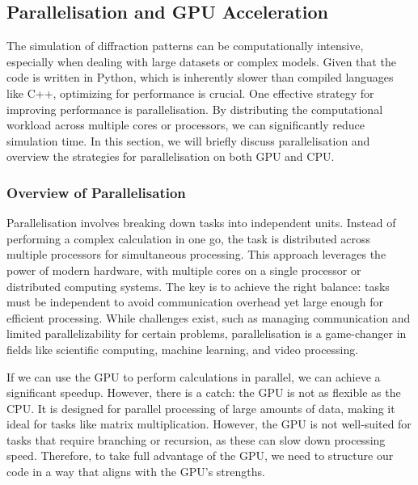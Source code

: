 \subsection{Parallelisation and GPU Acceleration}

The simulation of diffraction patterns can be computationally intensive, especially when dealing with large datasets or complex models. 
Given that the code is written in Python, which is inherently slower than compiled languages like C++, optimizing for performance is crucial. 
One effective strategy for improving performance is parallelisation. By distributing the computational workload across multiple cores or processors, 
we can significantly reduce simulation time. In this section, we will briefly discuss parallelisation and overview the strategies for parallelisation 
on both GPU and CPU.

\medskip

\subsubsection{Overview of Parallelisation}

Parallelisation involves breaking down tasks into independent units. Instead of performing a complex calculation in one go, the task is 
distributed across multiple processors for simultaneous processing. This approach leverages the power of modern hardware, with multiple cores 
on a single processor or distributed computing systems. The key is to achieve the right balance: tasks must be independent to avoid communication 
overhead yet large enough for efficient processing. While challenges exist, such as managing communication and limited parallelizability for certain 
problems, parallelisation is a game-changer in fields like scientific computing, machine learning, and video processing.

\medskip

If we can use the GPU to perform calculations in parallel, we can achieve a significant speedup. However, there is a catch: the GPU is not as 
flexible as the CPU. It is designed for parallel processing of large amounts of data, making it ideal for tasks like matrix multiplication. However, 
the GPU is not well-suited for tasks that require branching or recursion, as these can slow down processing speed. Therefore, to take full advantage of 
the GPU, we need to structure our code in a way that aligns with the GPU's strengths.

\medskip


